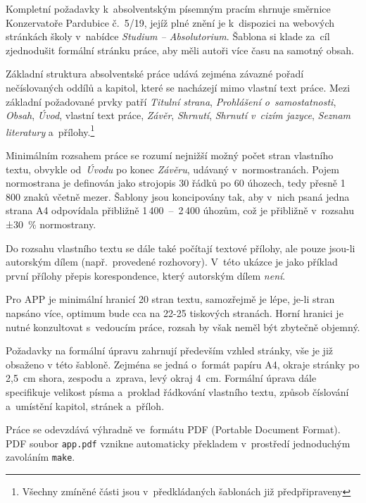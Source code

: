 Kompletní požadavky k~absolventským písemným pracím shrnuje směrnice
Konzervatoře Pardubice č.~5/19, jejíž plné znění je k~dispozici na webových
stránkách školy v~nabídce \textit{Studium – Absolutorium}. Šablona si klade
za~cíl zjednodušit formální stránku práce, aby měli autoři více času na samotný
obsah.

Základní struktura absolventské práce udává zejména závazné pořadí nečíslovaných
oddílů a kapitol, které se nacházejí mimo vlastní text práce. Mezi základní
požadované prvky patří \textit{Titulní strana}, \textit{Prohlášení
o~samostatnosti}, \textit{Obsah}, \textit{Úvod}, vlastní text práce,
\textit{Závěr}, \textit{Shrnutí}, \textit{Shrnutí v~cizím jazyce},
\textit{Seznam literatury} a~přílohy.\footnote{Všechny zmíněné části jsou
v~předkládaných šablonách již předpřipraveny}


Minimálním rozsahem práce se rozumí nejnižší možný počet stran vlastního textu,
obvykle od~\textit{Úvodu} po konec \textit{Závěru}, udávaný v~normostranách.
Pojem normostrana je definován jako strojopis 30 řádků po 60 úhozech, tedy
přesně 1\,800 znaků včetně mezer. Šablony jsou koncipovány tak, aby v~nich psaná
jedna strana A4 odpovídala přibližně 1\,400~–~2\,400 úhozům, což je přibližně
v~rozsahu ±30~\% normostrany.

Do rozsahu vlastního textu se dále také počítají textové přílohy, ale pouze
jsou-li autorským dílem (např.~provedené rozhovory). V~této ukázce je jako
příklad první přílohy přepis korespondence, který autorským dílem \textit{není}.

\noindent
Pro APP je minimální hranicí 20 stran textu, samozřejmě je lépe, je-li stran
napsáno více, optimum bude cca na 22-25 tiskových stranách. Horní hranici je
nutné konzultovat s~vedoucím práce, rozsah by však neměl být zbytečně objemný.

Požadavky na formální úpravu zahrnují především vzhled stránky, vše je již
obsaženo v této šabloně. Zejména se jedná o~formát papíru A4, okraje stránky
po 2,5~cm shora, zespodu a~zprava, levý okraj 4~cm.  Formální úprava dále
specifikuje velikost písma a~proklad řádkování vlastního textu, způsob číslování
a~umístění kapitol, stránek a~příloh.

Práce se odevzdává výhradně ve~formátu PDF (Portable Document Format). PDF
soubor \texttt{app.pdf} vznikne automaticky překladem v~prostředí {\XeLaTeX}
jednoduchým zavoláním \texttt{make}.

